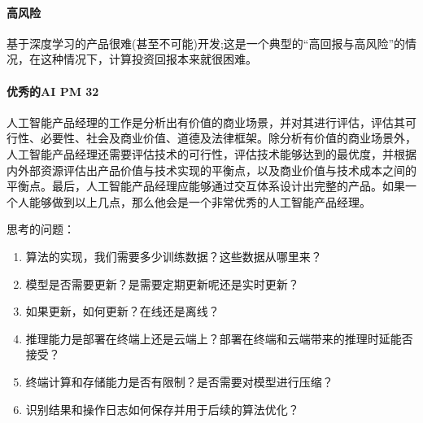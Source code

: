 \documentclass[letterpaper,11pt,english]{sphinxmanual}
\begin{document}


\paragraph{高风险}
\label{\detokenize{chapter_introduction/AI_PM:id40}}
基于深度学习的产品很难(甚至不可能)开发;这是一个典型的“高回报与高风险”的情况，在这种情况下，计算投资回报本来就很困难。


\paragraph{优秀的AI PM 32\sphinxfootnotemark[263]}
\label{\detokenize{chapter_introduction/AI_PM:ai-pm-32}}%
\begin{footnotetext}[263]\sphinxAtStartFootnote
{}
%
\end{footnotetext}\ignorespaces 
人工智能产品经理的工作是分析出有价值的商业场景，并对其进行评估，评估其可行性、必要性、社会及商业价值、道德及法律框架。除分析有价值的商业场景外，人工智能产品经理还需要评估技术的可行性，评估技术能够达到的最优度，并根据内外部资源评估出产品价值与技术实现的平衡点，以及商业价值与技术成本之间的平衡点。最后，人工智能产品经理应能够通过交互体系设计出完整的产品。如果一个人能够做到以上几点，那么他会是一个非常优秀的人工智能产品经理。

思考的问题：%
\begin{footnote}[264]\sphinxAtStartFootnote
{}
%
\end{footnote}
\begin{enumerate}
%
\item {} 
算法的实现，我们需要多少训练数据？这些数据从哪里来？

\item {} 
模型是否需要更新？是需要定期更新呢还是实时更新？

\item {} 
如果更新，如何更新？在线还是离线？

\item {} 
推理能力是部署在终端上还是云端上？部署在终端和云端带来的推理时延能否接受？

\item {} 
终端计算和存储能力是否有限制？是否需要对模型进行压缩？

\item {} 
识别结果和操作日志如何保存并用于后续的算法优化？

\end{enumerate}
\end{document}
